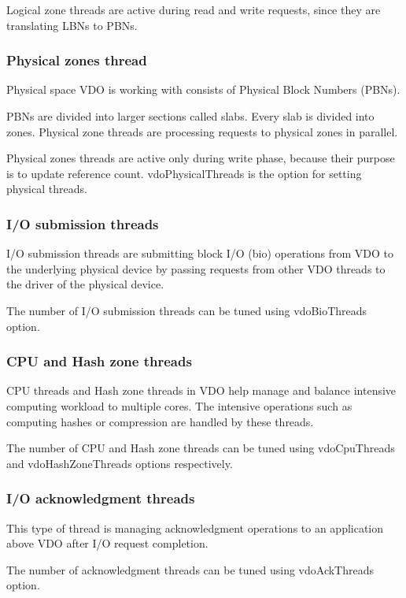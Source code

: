 \documentclass[
  color, %
  table, %
  lof,   %
  lot,   %
]{fithesis3}
\begin{document}
Logical zone threads are active during read and write requests, since they are translating LBNs to PBNs.

\subsubsection{Physical zones thread}
Physical space VDO is working with consists of Physical Block Numbers (PBNs).

PBNs are divided into larger sections called slabs. Every slab is divided into zones. Physical zone threads are processing requests to physical zones in parallel.

Physical zones threads are active only during write phase, because their purpose is to update reference count. vdoPhysicalThreads is the option for setting physical threads.


\subsubsection{I/O submission threads}
I/O submission threads are submitting block I/O (bio) operations from VDO to the underlying physical device by passing requests from other VDO threads to the driver of the physical device. 

The number of I/O submission threads can be tuned using vdoBioThreads option.

\subsubsection{CPU and Hash zone threads}
CPU threads and Hash zone threads in VDO help manage and balance intensive computing workload to multiple cores. The intensive operations such as computing hashes or compression are handled by these threads.

The number of CPU and Hash zone threads can be tuned using vdoCpuThreads and vdoHashZoneThreads options respectively.

\subsubsection{I/O acknowledgment threads}
This type of thread is managing acknowledgment operations to an application above VDO after I/O request completion.

The number of acknowledgment threads can be tuned using vdoAckThreads option.

\end{document}
